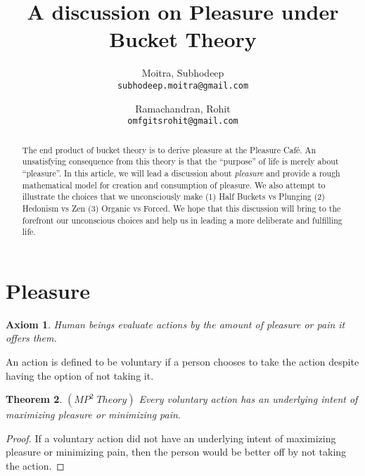 \documentclass{article}
\newtheorem{theorem}{Theorem}[section]
\newtheorem{axiom}[theorem]{Axiom}
\newenvironment{definition}[1][Definition]{\begin{trivlist}
\item[\hskip \labelsep {\bfseries #1}]}{\end{trivlist}}
\begin{document}
\title{A discussion on Pleasure under Bucket Theory}

\author{
	Moitra, Subhodeep \\ 
	{\tt subhodeep.moitra@gmail.com}
	\and
	Ramachandran, Rohit\\
	{\tt omfgitsrohit@gmail.com}
}

\maketitle

\begin{abstract}
The end product of bucket theory is to derive pleasure at the Pleasure Caf\'e. An unsatisfying consequence from this theory is that the ``purpose'' of life is merely about ``pleasure''. In this article, we will lead a discussion about \textit{pleasure} and provide a rough mathematical model for creation and consumption of pleasure. We also attempt to illustrate the choices that we unconsciously make (1) Half Buckets vs Plunging (2) Hedonism vs Zen (3) Organic vs Forced. We hope that this discussion will bring to the forefront our unconscious choices and help us in leading a more deliberate and fulfilling life. 
\end{abstract} 

\section{Pleasure}

\begin{axiom}
Human beings evaluate actions by the amount of pleasure or pain it offers them.
\end{axiom}

\begin{definition}
An action is defined to be voluntary if a person chooses to take the action despite having the option of not taking it.
\end{definition}

\begin{theorem}
\emph{$(MP^2 \; Theory)$}
\label{mp2}
Every voluntary action has an underlying intent of maximizing pleasure or minimizing pain.
\end{theorem}

\begin{proof}
If a voluntary action did not have an underlying intent of maximizing pleasure or minimizing pain, then the person would be better off by not taking the action.
\end{proof}
\end{document}
